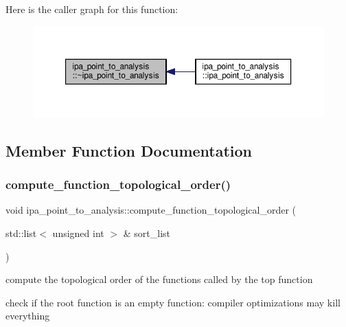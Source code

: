 Here is the caller graph for this function\+:
\nopagebreak
\begin{figure}[H]
\begin{center}
\leavevmode
\includegraphics[width=350pt]{d6/d2c/classipa__point__to__analysis_a9af2dcc2b52f329b11729242a076d9b5_icgraph}
\end{center}
\end{figure}


\subsection{Member Function Documentation}
\mbox{\label{classipa__point__to__analysis_af0c17eb410da57bdc9a4e17dca79ef34}} 
\subsubsection{\texorpdfstring{compute\+\_\+function\+\_\+topological\+\_\+order()}{compute\_function\_topological\_order()}}
{\footnotesize\ttfamily void ipa\+\_\+point\+\_\+to\+\_\+analysis\+::compute\+\_\+function\+\_\+topological\+\_\+order (\begin{DoxyParamCaption}\item[{std\+::list$<$ unsigned int $>$ \&}]{sort\+\_\+list }\end{DoxyParamCaption})\hspace{0.3cm}{\ttfamily [private]}}



compute the topological order of the functions called by the top function 

check if the root function is an empty function\+: compiler optimizations may kill everything

